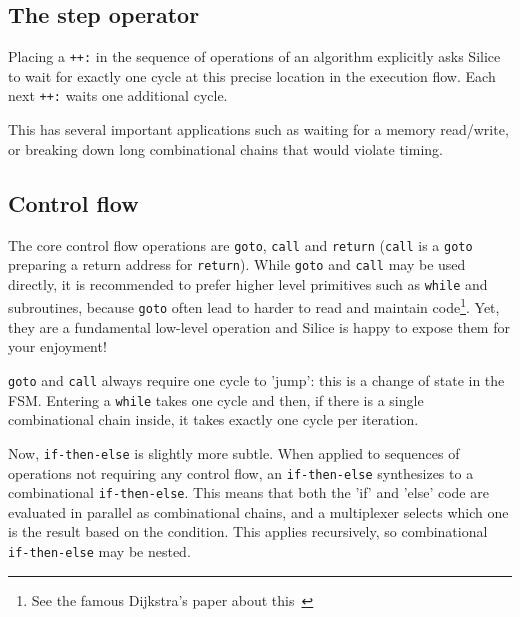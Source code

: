 \documentclass[a4]{article}
\newcommand\silice{Silice}
\begin{document}
\subsection{The {step} operator}
\label{sec:step}

Placing a \texttt{++:} in the sequence of operations of an algorithm explicitly asks \silice{} to wait for exactly one cycle at this precise location in the execution flow. Each next \texttt{++:} waits one additional cycle.

This has several important applications such as waiting for a memory read/write, or breaking down long combinational chains that would violate timing.



%
%
%
%
% 


\subsection{Control flow}

The core control flow operations are \texttt{goto}, \texttt{call} and \texttt{return} (\texttt{call} is a \texttt{goto} preparing a return address for \texttt{return}). 
%
While \texttt{goto} and \texttt{call} may be used directly, it is recommended to prefer higher level primitives such as \texttt{while} and subroutines, because \texttt{goto} often lead to harder to read and maintain code\footnote{See the famous Dijkstra's paper about this~\cite{dijkstra}}. Yet, they are a fundamental low-level operation and \silice{} is happy to expose them for your enjoyment!

\texttt{goto} and \texttt{call} always require one cycle to 'jump': this is a change of state in the FSM. Entering a \texttt{while} takes one cycle and then, if there is a single combinational chain inside, it takes exactly one cycle per iteration. 

Now, \texttt{if-then-else} is slightly more subtle. When applied to sequences of operations not requiring any control flow, an \texttt{if-then-else} synthesizes to a combinational \texttt{if-then-else}. This means that both the 'if' and 'else' code are evaluated in parallel as combinational chains, and a multiplexer selects which one is the result based on the condition. This applies recursively, so combinational \texttt{if-then-else} may be nested.
\end{document}
